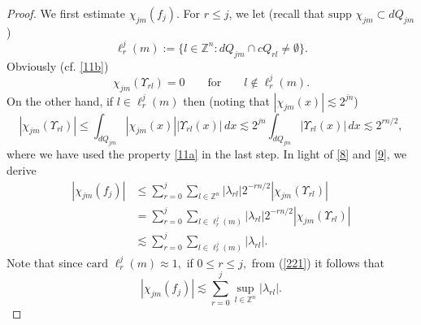 \documentclass[11pt, a4paper,leqno]{amsart}
\theoremstyle{plain}
\numberwithin{equation}{section}
\theoremstyle{definition}
\theoremstyle{remark}
\begin{document}
\begin{proof}
We first estimate $\chi_{jm}(f_{j})$. For $r\leq j$, we let (recall that $\text{supp } \chi_{j m} \subset d Q_{j m}$)
\begin{equation}
\ell_{r}^{j}(m):=\{l\in\mathbb{Z}^{n}:dQ_{jm}\cap cQ_{rl}\neq\emptyset\}.
\label{7}%
\end{equation}
Obviously (cf. \eqref{11b})
\begin{equation}
\chi_{jm}(\Upsilon_{rl})=0\qquad\text{for}\qquad l\not \in \ell_{r}^{j}(m).
\label{8}%
\end{equation}
On the other hand, if $l\in\ell_{r}^{j}(m)$ then (noting that $|\chi_{j m}(x)| \lesssim 2^{j n}$)
\begin{equation}
|\chi_{jm}(\Upsilon_{rl})|\leq\int_{dQ_{jm}}|\chi_{jm}(x)||\Upsilon
_{rl}(x)|\,dx\lesssim2^{jn}\int_{dQ_{jm}}|\Upsilon_{rl}(x)|\,dx\lesssim
2^{rn/2}, \label{9}%
\end{equation}
where we have used the property \eqref{11a} in the last step. In light of
\eqref{8} and \eqref{9}, we derive
\begin{align}
|\chi_{jm}(f_{j})|  &  \leq\sum_{r=0}^{j}\sum_{l\in\mathbb{Z}^{n}}%
|\lambda_{rl}|2^{-rn/2}|\chi_{jm}(\Upsilon_{rl})|\nonumber\\
&  =\sum_{r=0}^{j}\sum_{l\in\ell_{r}^{j}(m)}|\lambda_{rl}|2^{-rn/2}|\chi
_{jm}(\Upsilon_{rl})|\nonumber\\
&  \lesssim\sum_{r=0}^{j}\sum_{l\in\ell_{r}^{j}(m)}|\lambda_{rl}|. \label{221}%
\end{align}
Note that since $\text{card }\ell_{r}^{j}(m)\approx1,$ if $0\leq r\leq j,$
from (\ref{221}) it follows that
\begin{equation}
|\chi_{jm}(f_{j})|\lesssim\sum_{r=0}^{j}\sup_{l\in\mathbb{Z}^{n}}|\lambda
_{rl}|. \label{10}%
\end{equation}



\end{proof}
\end{document}
